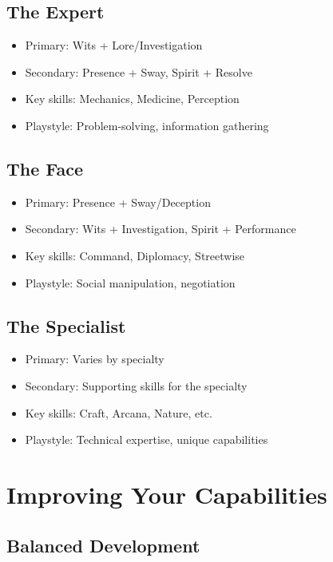 \documentclass[11pt,twoside,openany]{book}
\begin{document}
\subsection*{The Expert}

\begin{itemize}
\item Primary: Wits + Lore/Investigation
\item Secondary: Presence + Sway, Spirit + Resolve
\item Key skills: Mechanics, Medicine, Perception
\item Playstyle: Problem-solving, information gathering
\end{itemize}

\subsection*{The Face}

\begin{itemize}
\item Primary: Presence + Sway/Deception
\item Secondary: Wits + Investigation, Spirit + Performance
\item Key skills: Command, Diplomacy, Streetwise
\item Playstyle: Social manipulation, negotiation
\end{itemize}

\subsection*{The Specialist}

\begin{itemize}
\item Primary: Varies by specialty
\item Secondary: Supporting skills for the specialty
\item Key skills: Craft, Arcana, Nature, etc.
\item Playstyle: Technical expertise, unique capabilities
\end{itemize}

\section*{Improving Your Capabilities} 

\subsection*{Balanced Development}
\end{document}
